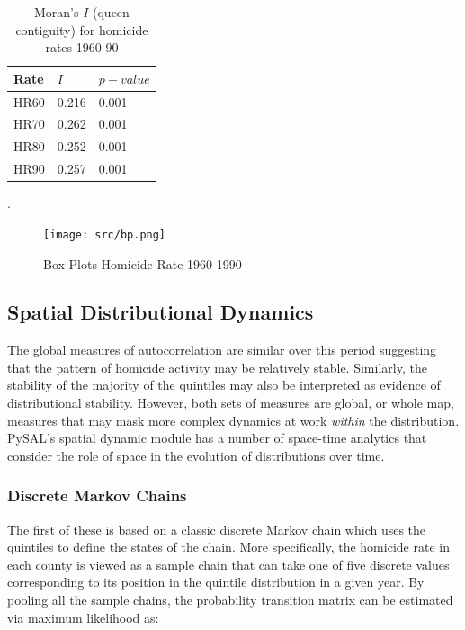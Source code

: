 \documentclass[11pt, titlepage]{amsart}
\begin{document}
\begin{table}
  \centering
  \small
\begin{tabular}{|lll|}
  \hline
  Rate&$I$&$p-value$\\
  \hline
HR60& 0.216& 0.001\\
HR70& 0.262& 0.001\\
HR80& 0.252& 0.001\\
HR90& 0.257& 0.001\\
\hline
\end{tabular}
\caption{Moran's $I$ (queen contiguity) for homicide rates 1960-90}.
\label{t:mi}
\end{table}




\begin{figure}[ht]
\begin{center}
\texttt{[image: src/bp.png]}
\end{center}
\caption{Box Plots Homicide Rate 1960-1990}
\label{f:bp}
\end{figure}   


\subsection{Spatial Distributional Dynamics}

The global measures of autocorrelation are similar over this period
suggesting that the pattern of homicide activity may be relatively
stable. Similarly, the stability of the majority of the quintiles may
also be interpreted as evidence of distributional stability. However,
both sets of measures are global, or whole map, measures that may mask
more complex dynamics at work \emph{within} the distribution. PySAL's
spatial dynamic module has a number of space-time analytics that
consider the role of space in the evolution of distributions over time.

\subsubsection{Discrete Markov Chains}

The first of these is based on a classic discrete Markov chain which
uses the quintiles to define the states of the chain. More specifically,
the homicide rate in each county is viewed as a sample chain that can
take one of five discrete values corresponding to its position in the
quintile distribution in a given year. By pooling all the sample chains,
the probability transition matrix can be estimated via maximum
likelihood as:
\end{document}

